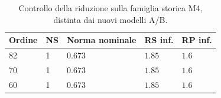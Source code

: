 \begin{table}[htbp]\centering\small
\begin{tabular}{lllll}\toprule
Ordine & NS & Norma nominale & RS inf. & RP inf.\\\midrule
82 & 1 & $0.673$ & $1.85$ & $1.6$\\
70 & 1 & $0.673$ & $1.85$ & $1.6$\\
60 & 1 & $0.673$ & $1.85$ & $1.6$\\
\bottomrule\end{tabular}
\caption{Controllo della riduzione sulla famiglia storica M4, distinta dai nuovi modelli A/B.}
\end{table}

